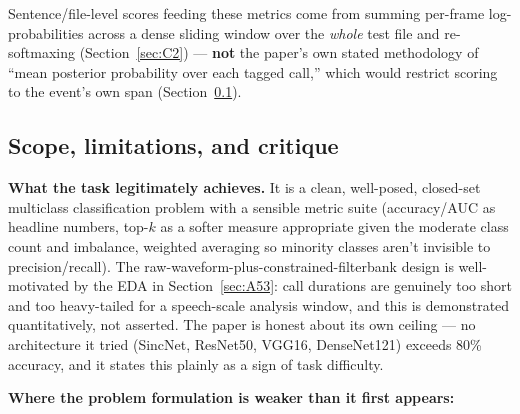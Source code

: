 \documentclass[11pt]{article}
\begin{document}
Sentence/file-level scores feeding these metrics come from summing per-frame
log-probabilities across a dense sliding window over the \emph{whole} test
file and re-softmaxing (Section~\ref{sec:C2}) --- \textbf{not} the paper's
own stated methodology of ``mean posterior probability over each tagged
call,'' which would restrict scoring to the event's own span (Section~\ref{sec:A7}).

\subsection{Scope, limitations, and critique}
\label{sec:A7}

\textbf{What the task legitimately achieves.} It is a clean, well-posed,
closed-set multiclass classification problem with a sensible metric suite
(accuracy/AUC as headline numbers, top-$k$ as a softer measure appropriate
given the moderate class count and imbalance, weighted averaging so minority
classes aren't invisible to precision/recall). The raw-waveform-plus-constrained-filterbank
design is well-motivated by the EDA in Section~\ref{sec:A53}: call durations
are genuinely too short and too heavy-tailed for a speech-scale analysis
window, and this is demonstrated quantitatively, not asserted. The paper is
honest about its own ceiling --- no architecture it tried (SincNet,
ResNet50, VGG16, DenseNet121) exceeds 80\% accuracy, and it states this
plainly as a sign of task difficulty.

\textbf{Where the problem formulation is weaker than it first appears:}
\end{document}

